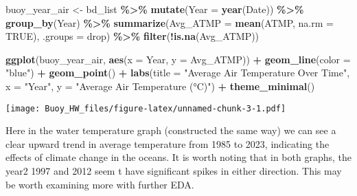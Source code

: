 \documentclass[
]{article}
\newenvironment{Shaded}{\begin{snugshade}}{\end{snugshade}}
\newcommand{\AttributeTok}[1]{\textcolor[rgb]{0.13,0.29,0.53}{#1}}
\newcommand{\ConstantTok}[1]{\textcolor[rgb]{0.56,0.35,0.01}{#1}}
\newcommand{\FunctionTok}[1]{\textcolor[rgb]{0.13,0.29,0.53}{\textbf{#1}}}
\newcommand{\NormalTok}[1]{#1}
\newcommand{\OtherTok}[1]{\textcolor[rgb]{0.56,0.35,0.01}{#1}}
\newcommand{\SpecialCharTok}[1]{\textcolor[rgb]{0.81,0.36,0.00}{\textbf{#1}}}
\newcommand{\StringTok}[1]{\textcolor[rgb]{0.31,0.60,0.02}{#1}}
\begin{document}
\begin{Shaded}
\begin{Highlighting}[]
\NormalTok{buoy\_year\_air }\OtherTok{\textless{}{-}}\NormalTok{ bd\_list }\SpecialCharTok{\%\textgreater{}\%}
  \FunctionTok{mutate}\NormalTok{(}\AttributeTok{Year =} \FunctionTok{year}\NormalTok{(Date)) }\SpecialCharTok{\%\textgreater{}\%}
  \FunctionTok{group\_by}\NormalTok{(Year) }\SpecialCharTok{\%\textgreater{}\%}
  \FunctionTok{summarize}\NormalTok{(}\AttributeTok{Avg\_ATMP =} \FunctionTok{mean}\NormalTok{(ATMP, }\AttributeTok{na.rm =} \ConstantTok{TRUE}\NormalTok{), }\AttributeTok{.groups =} \StringTok{\textquotesingle{}drop\textquotesingle{}}\NormalTok{) }\SpecialCharTok{\%\textgreater{}\%}
  \FunctionTok{filter}\NormalTok{(}\SpecialCharTok{!}\FunctionTok{is.na}\NormalTok{(Avg\_ATMP))  }

\FunctionTok{ggplot}\NormalTok{(buoy\_year\_air, }\FunctionTok{aes}\NormalTok{(}\AttributeTok{x =}\NormalTok{ Year, }\AttributeTok{y =}\NormalTok{ Avg\_ATMP)) }\SpecialCharTok{+}
  \FunctionTok{geom\_line}\NormalTok{(}\AttributeTok{color =} \StringTok{"blue"}\NormalTok{) }\SpecialCharTok{+}
  \FunctionTok{geom\_point}\NormalTok{() }\SpecialCharTok{+}
  \FunctionTok{labs}\NormalTok{(}\AttributeTok{title =} \StringTok{"Average Air Temperature Over Time"}\NormalTok{,}
       \AttributeTok{x =} \StringTok{"Year"}\NormalTok{,}
       \AttributeTok{y =} \StringTok{"Average Air Temperature (°C)"}\NormalTok{) }\SpecialCharTok{+}
  \FunctionTok{theme\_minimal}\NormalTok{()}
\end{Highlighting}
\end{Shaded}

\texttt{[image: Buoy\_HW\_files/figure-latex/unnamed-chunk-3-1.pdf]}

Here in the water temperature graph (constructed the same way) we can
see a clear upward trend in average temperature from 1985 to 2023,
indicating the effects of climate change in the oceans. It is worth
noting that in both graphs, the year2 1997 and 2012 seem t have
significant spikes in either direction. This may be worth examining more
with further EDA.
\end{document}
